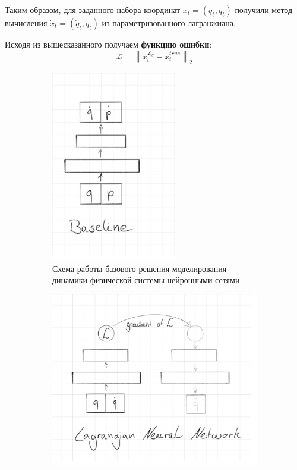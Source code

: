 \documentclass[12pt]{article}
\begin{document}
	Таким образом, для заданного набора координат $x_t = (q_t, \dot{q}_t)$ получили метод вычисления $\dot{x}_t = (\dot{q}_t, \ddot{q}_t)$ из параметризованного лагранжиана.
	 
	 Исходя из вышесказанного получаем \textbf{функцию ошибки}: $$\mathcal{L} = \left\|\dot{x}^{\mathcal{L_{\theta}}}_t -\dot{x}^{true}_t\right\|_{2}$$

	\begin{figure}[H]
		\centering
		\begin{subfigure}[b]{0.49\textwidth}
			\centering
			\includegraphics[width=0.6\textwidth]{baseline_nn_scheme.png}
			\caption{Схема работы базового решения моделирования динамики физической системы нейронными сетями}
			\label{fig:y equals x}
		\end{subfigure}
		\hfill
		\begin{subfigure}[b]{0.49\textwidth}
			\centering
			\includegraphics[width=\textwidth]{lnn_scheme.png}

\end{subfigure}
\end{figure}
\end{document}
